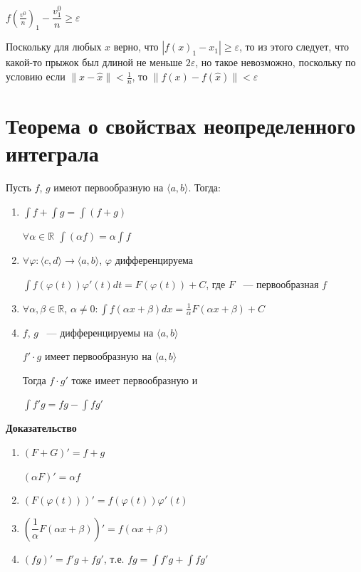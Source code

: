 \documentclass{article}
\begin{document}
			$f\left(\frac{v^0}{n}\right)_1 - \dfrac{v^0_1}{n} \geq \varepsilon$
	
			Поскольку для любых $x$ верно, что $|f(x)_1 - x_1| \geq \varepsilon$, то из этого следует, что какой-то прыжок был длиной не меньше $2 \varepsilon$, но такое невозможно, поскольку по условию если $\| x - \widehat{x} \| < \frac{1}{n}$, то $\| f(x) - f(\widehat{x}) \| < \varepsilon$
				
				
	\newpage

	\section{Теорема о свойствах неопределенного интеграла}
	
		Пусть $f$, $g$ имеют первообразную на $\langle a, b \rangle$. Тогда:
		
		\begin{enumerate}
		
			\item $\int f + \int g  = \int (f + g)$
			
				$\forall \alpha \in \mathbb{R}$ $\int(\alpha f) = \alpha \int{f}$
				
			\item $\forall \varphi: \langle c, d \rangle \rightarrow \langle a, b \rangle$, $\varphi$ дифференцируема
			
				$\int f(\varphi(t))\varphi'(t)dt = F(\varphi(t)) + C$, где $F$ ~--- первообразная $f$
				
			\item $\forall \alpha, \beta \in \mathbb{R}$, $\alpha \neq 0 : \int f(\alpha x + \beta)dx = \frac{1}{\alpha} F(\alpha x + \beta) + C$
			
			\item $f$, $g$ ~--- дифференцируемы на $\langle a, b \rangle$
			
				$f' \cdot g$ имеет первообразную на $\langle a, b \rangle$
				
				Тогда $f \cdot g'$ тоже имеет первообразную и 
				
				$\int f'g = fg - \int fg'$
				
		\end{enumerate}
			
		\textbf{Доказательство}
		
		\begin{enumerate}
		
			\item $(F + G)' = f + g$
			
				$(\alpha F)' = \alpha f$
				
			\item $(F(\varphi(t)))' = f(\varphi(t))\varphi'(t)$
			
			\item $\left(\dfrac{1}{\alpha} F (\alpha x + \beta)\right)' = f(\alpha x + \beta)$
			
			\item $(fg)' = f'g + fg'$, т.е. $fg = \int f'g + \int fg'$
			
		\end{enumerate}
		
\end{document}
